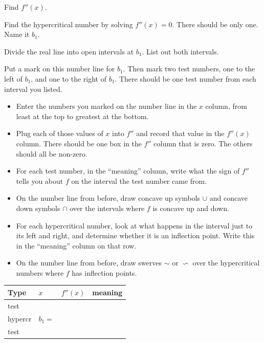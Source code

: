 \begin{ProblemSet}
 \begin{Problem}
  Find $f''(x)$.
 \end{Problem}
 \begin{Problem}
  Find the hypercritical number by solving $f''(x)=0$.
  There should be only one.
  Name it $b_1$.
 \end{Problem}
 \begin{Problem}
  Divide the real line into open intervals at $b_1$.
  List out both intervals.
 \end{Problem}
 \begin{Problem}[pencil space=0in]
  Put a mark on this number line for $b_1$.
  Then mark two test numbers, one to the left of $b_1$,
  and one to the right of $b_1$.
  There should be one test number from each interval you listed.

  \NumberLine
 \end{Problem}

 \begin{Problem}[pencil space=0in]
  \begin{itemize}
  \item Enter the numbers you marked on the number line in the $x$ column, from least at the top to greatest at the bottom.
  \item Plug each of those values of $x$ into $f''$ and record that value in the $f''(x)$ column.
   There should be one box in the $f''$ column that is zero.
   The others should all be non-zero.
  \item For each test number, in the ``meaning'' column, write what the sign of $f''$ tells you about $f$ on the interval the test number came from.
  \item On the number line from before, draw concave up symbols $\cup$ and concave down symbols $\cap$ over the intervals where $f$ is concave up and down.
  \item For each hypercritical number, look at what happens in the interval just to its left and right, and determine whether it is an inflection point.
   Write this in the ``meaning'' column on that row.
  \item On the number line from before, draw swerves $\sim$ or $\backsim$ over the hypercritical numbers where $f$ has inflection points.
  \end{itemize}
  \bigskip

  \newcommand{\Bx}[1]{\Strut[-0.25in]{0.75in}#1}
  \begin{tabular}{l|p{1in}|p{1in}|p{3in}}
    Type & $x$ & $f''(x)$ & meaning
    \\ \hline
    \Bx{test} & & &
    \\ \hline
    \Bx{hypercr} & \Bx{$b_1 = $} & &
    \\ \hline
    \Bx{test} & & &
    \\ \hline
  \end{tabular}


\end{Problem}
\end{ProblemSet}
